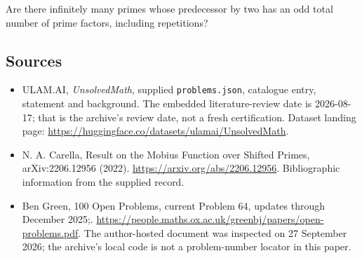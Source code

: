 \documentclass[11pt,a4paper]{article}
\begin{document}
Are there infinitely many primes whose predecessor by two has an odd total number of prime factors, including repetitions?

\subsection{Sources}

{\small

\begin{itemize}

\item[\hypertarget{source:statement:1}{S1}] ULAM.AI, \emph{UnsolvedMath}, supplied \texttt{problems.json}, catalogue entry, statement and background. The embedded literature-review date is 2026-08-17; that is the archive’s review date, not a fresh certification. Dataset landing page: \url{https://huggingface.co/datasets/ulamai/UnsolvedMath}.

\item[\hypertarget{source:statement:2}{S2}] N. A. Carella, Result on the Mobius Function over Shifted Primes, arXiv:2206.12956 (2022). \url{https://arxiv.org/abs/2206.12956}. Bibliographic information from the supplied record.

\item[\hypertarget{source:statement:3}{S3}] Ben Green, 100 Open Problems, current Problem 64, updates through December 2025;. \url{https://people.maths.ox.ac.uk/greenbj/papers/open-problems.pdf}. The author-hosted document was inspected on 27 September 2026; the archive’s local code is not a problem-number locator in this paper.

\end{itemize}

}

\label{end:statement}
\end{document}
